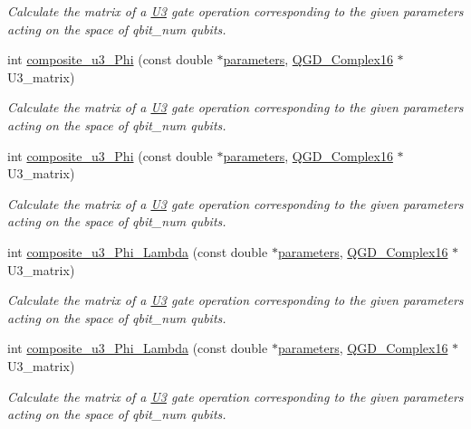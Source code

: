 \begin{DoxyCompactItemize}
\begin{DoxyCompactList}\small\item\em Calculate the matrix of a \hyperlink{class_u3}{U3} gate operation corresponding to the given parameters acting on the space of qbit\+\_\+num qubits. \end{DoxyCompactList}\item 
int \hyperlink{class_u3_a70b7ede57edd7f8a3ed6d54a63b1ecdb}{composite\+\_\+u3\+\_\+\+Phi} (const double $\ast$\hyperlink{class_u3_a6b07be37e63be67b306393a90d759f70}{parameters}, \hyperlink{struct_q_g_d___complex16}{Q\+G\+D\+\_\+\+Complex16} $\ast$U3\+\_\+matrix)
\begin{DoxyCompactList}\small\item\em Calculate the matrix of a \hyperlink{class_u3}{U3} gate operation corresponding to the given parameters acting on the space of qbit\+\_\+num qubits. \end{DoxyCompactList}\item 
int \hyperlink{class_u3_a70b7ede57edd7f8a3ed6d54a63b1ecdb}{composite\+\_\+u3\+\_\+\+Phi} (const double $\ast$\hyperlink{class_u3_a6b07be37e63be67b306393a90d759f70}{parameters}, \hyperlink{struct_q_g_d___complex16}{Q\+G\+D\+\_\+\+Complex16} $\ast$U3\+\_\+matrix)
\begin{DoxyCompactList}\small\item\em Calculate the matrix of a \hyperlink{class_u3}{U3} gate operation corresponding to the given parameters acting on the space of qbit\+\_\+num qubits. \end{DoxyCompactList}\item 
int \hyperlink{class_u3_a62f6076ffeb60d2e6198bcb26d351c99}{composite\+\_\+u3\+\_\+\+Phi\+\_\+\+Lambda} (const double $\ast$\hyperlink{class_u3_a6b07be37e63be67b306393a90d759f70}{parameters}, \hyperlink{struct_q_g_d___complex16}{Q\+G\+D\+\_\+\+Complex16} $\ast$U3\+\_\+matrix)
\begin{DoxyCompactList}\small\item\em Calculate the matrix of a \hyperlink{class_u3}{U3} gate operation corresponding to the given parameters acting on the space of qbit\+\_\+num qubits. \end{DoxyCompactList}\item 
int \hyperlink{class_u3_a62f6076ffeb60d2e6198bcb26d351c99}{composite\+\_\+u3\+\_\+\+Phi\+\_\+\+Lambda} (const double $\ast$\hyperlink{class_u3_a6b07be37e63be67b306393a90d759f70}{parameters}, \hyperlink{struct_q_g_d___complex16}{Q\+G\+D\+\_\+\+Complex16} $\ast$U3\+\_\+matrix)
\begin{DoxyCompactList}\small\item\em Calculate the matrix of a \hyperlink{class_u3}{U3} gate operation corresponding to the given parameters acting on the space of qbit\+\_\+num qubits. \end{DoxyCompactList}\item 

\end{DoxyCompactItemize}
